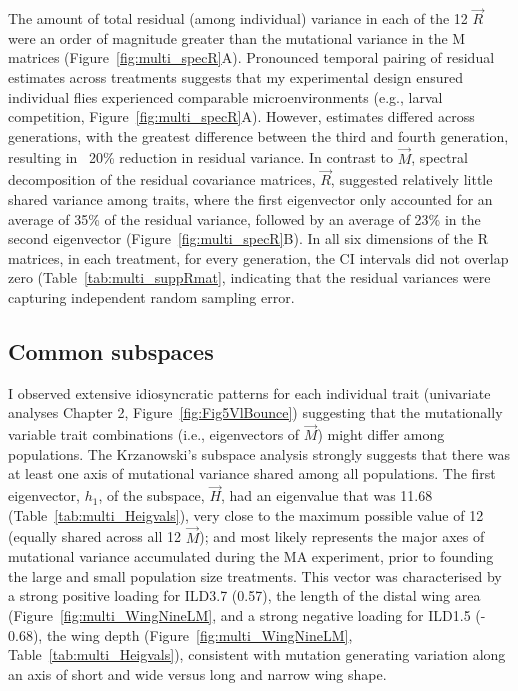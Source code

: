 The amount of total residual (among individual) variance in each of the 12 $\vec{R}$ were an order of magnitude greater than the mutational variance in the M matrices (Figure~\ref{fig:multi_specR}A). Pronounced temporal pairing of residual estimates across treatments suggests that my experimental design ensured individual flies experienced comparable microenvironments (e.g., larval competition, Figure~\ref{fig:multi_specR}A). However, estimates differed across generations, with the greatest difference between the third and fourth generation, resulting in ~20\% reduction in residual variance. In contrast to $\vec{M}$, spectral decomposition of the residual covariance matrices, $\vec{R}$, suggested relatively little shared variance among traits, where the first eigenvector only accounted for an average of 35\% of the residual variance, followed by an average of 23\% in the second eigenvector (Figure~\ref{fig:multi_specR}B). In all six dimensions of the R matrices, in each treatment, for every generation, the CI intervals did not overlap zero (Table~\ref{tab:multi_suppRmat}, indicating that the residual variances were capturing independent random sampling error. \par

\subsection{Common subspaces}

I observed extensive idiosyncratic patterns for each individual trait (univariate analyses Chapter 2, Figure~\ref{fig:Fig5VlBounce}) suggesting that the mutationally variable trait combinations (i.e., eigenvectors of $\vec{M}$) might differ among populations. The Krzanowski’s subspace analysis strongly suggests that there was at least one axis of mutational variance shared among all populations. The first eigenvector, $h_1$, of the subspace, $\vec{H}$, had an eigenvalue that was 11.68 (Table~\ref{tab:multi_Heigvals}), very close to the maximum possible value of 12 (equally shared across all 12 $\vec{M}$); and most likely represents the major axes of mutational variance accumulated during the MA experiment, prior to founding the large and small population size treatments. This vector was characterised by a strong positive loading for ILD3.7 (0.57), the length of the distal wing area (Figure~\ref{fig:multi_WingNineLM}, and a strong negative loading for ILD1.5 (- 0.68), the wing depth (Figure~\ref{fig:multi_WingNineLM}, Table~\ref{tab:multi_Heigvals}), consistent with mutation generating variation along an axis of short and wide versus long and narrow wing shape. \par

